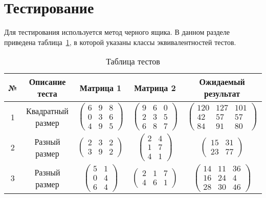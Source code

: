 \section{Тестирование}
Для тестирования используется метод черного ящика. В данном разделе приведена таблица~\ref{table:ref1}, в которой указаны классы эквивалентностей тестов.
\begin{table}[H]
	\centering
	\captionsetup{singlelinecheck = false, justification=raggedright}
	\caption{Таблица тестов}
	\label{table:ref1}
	\begin{tabular}{|c|c|c|c|c|}
		\hline
		№ &Описание теста & Матрица 1  &  Матрица 2   &  Ожидаемый результат\\\hline
		1& Квадратный размер  & $\begin{pmatrix}6 & 9 & 8\\0 & 3 & 6\\4 & 9 & 5\end{pmatrix}$
		& $\begin{pmatrix}9 & 6 & 0\\2 & 3 & 5\\6 & 8 & 7\end{pmatrix}$
		& $\begin{pmatrix}120 & 127 & 101\\42 & 57 & 57\\84 & 91 & 80\end{pmatrix}$
		\\ \hline
		2& Разный размер	  & $\begin{pmatrix}2 & 3 & 2\\3 & 9 & 2\end{pmatrix}$
		& $\begin{pmatrix}2 & 4\\1 & 7\\4 & 1\end{pmatrix}$
		& $\begin{pmatrix}15 & 31\\23 & 77\end{pmatrix}$
		\\ \hline
		3&Разный размер		& $\begin{pmatrix}5 & 1\\0 & 4\\6 & 4\end{pmatrix}$
		& $\begin{pmatrix}2 & 1 & 7\\4 & 6 & 1\end{pmatrix}$
		& $\begin{pmatrix}14 & 11 & 36\\16 & 24 & 4\\28 & 30 & 46\end{pmatrix}$

\end{tabular}
\end{table}
